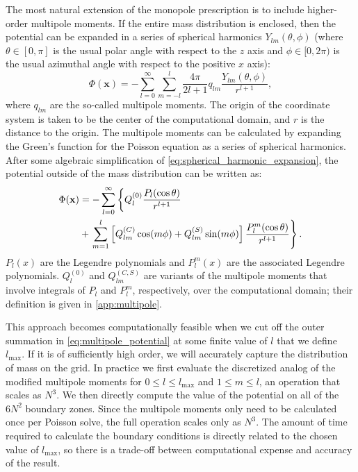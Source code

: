 \documentclass[12pt]{article}
\begin{document}
The most natural extension of the monopole prescription is to include
higher-order multipole moments. If the entire mass distribution is
enclosed, then the potential can be expanded in a series of spherical
harmonics $Y_{lm}(\theta,\phi)$ (where $\theta \in [0, \pi]$ is the usual polar angle
with respect to the $z$ axis and $\phi \in [0, 2\pi)$ is the usual azimuthal angle with
respect to the positive $x$ axis):
\begin{equation}
  \Phi(\mathbf{x}) = -\sum_{l=0}^{\infty}\sum_{m=-l}^{l} \frac{4\pi}{2l + 1} q_{lm} \frac{Y_{lm}(\theta,\phi)}{r^{l+1}}, \label{eq:spherical_harmonic_expansion}
\end{equation}
where $q_{lm}$ are the so-called multipole moments. The origin of the
coordinate system is taken to be the center of the computational
domain, and $r$ is the distance to the origin. The multipole moments
can be calculated by expanding the Green's function for the Poisson
equation as a series of spherical harmonics. After some algebraic
simplification of \autoref{eq:spherical_harmonic_expansion}, 
the potential outside of the mass distribution can be written as:
\begin{align}
  \Phi(\mathbf{x}) &= -\sum_{l=0}^{\infty} \left\{Q_l^{(0)} \frac{P_l(\text{cos}\, \theta)}{r^{l+1}} \right. \notag \\
    &+ \left. \sum_{m = 1}^{l}\left[ Q_{lm}^{(C)}\, \text{cos}(m\phi) + Q_{lm}^{(S)}\, \text{sin}(m\phi)\right] \frac{P_{l}^{m}(\text{cos}\, \theta)}{r^{l+1}} \right\}.\label{eq:multipole_potential}
\end{align}
$P_l(x)$ are the Legendre polynomials and $P_{l}^{m}(x)$ are the associated Legendre polynomials.
$Q_l^{(0)}$ and $Q_{lm}^{(C,S)}$ are variants of the multipole moments that involve integrals of
$P_l$ and $P_l^m$, respectively, over the computational domain; their definition is given in \autoref{app:multipole}.

This approach becomes computationally feasible when we cut off the
outer summation in \autoref{eq:multipole_potential} at some finite
value of $l$ that we define $l_{\text{max}}$. If it is of sufficiently high order, we
will accurately capture the distribution of mass on the grid. In
practice we first evaluate the discretized analog of the modified
multipole moments for $0 \leq l \leq l_{\text{max}}$ and $1 \leq m
\leq l$, an operation that scales as $N^3$. We then directly compute
the value of the potential on all of the $6N^2$ boundary zones. Since
the multipole moments only need to be calculated once per Poisson
solve, the full operation scales only as $N^3$. The amount of time
required to calculate the boundary conditions is directly related
to the chosen value of $l_{\text{max}}$, so there is a trade-off
between computational expense and accuracy of the result.
\end{document}
